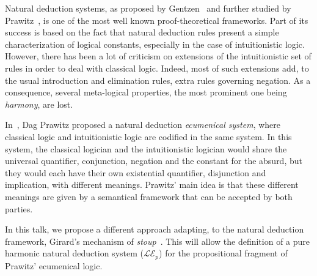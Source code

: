 \documentclass[bsl,meeting]{asl}
\newcommand{\NP}{}
\begin{document}
\thispagestyle{empty}


\NP  
{}

Natural deduction systems, as proposed by Gentzen~\cite{gentzen1969} and further studied by Prawitz~\cite{prawitz1965}, is one of the most well known proof-theoretical frameworks. Part of its success is based on the fact that natural deduction rules present a simple characterization of logical constants, especially in the case of intuitionistic logic. However, there has been a lot of criticism on extensions of the intuitionistic set of rules in order to deal with classical logic. Indeed, most of such extensions add, to the usual introduction and elimination rules, extra rules governing  negation. As a consequence, several meta-logical properties, the most prominent one being {\em harmony}, are lost.

In~\cite{DBLP:journals/Prawitz15}, Dag Prawitz proposed a
natural deduction {\em ecumenical system}, where classical logic and intuitionistic logic are codified in the same system. In this system, 
the classical logician and the intuitionistic logician would share the universal quantifier, conjunction, negation and the constant for the absurd, but they would each have their own existential quantifier, disjunction and implication, with different meanings. Prawitz' main idea is that these different meanings are given by a semantical framework that can be accepted by both parties.  

In this talk, we propose a different approach adapting, to the natural deduction framework,  Girard's mechanism of \textit{stoup}~\cite{DBLP:journals/mscs/Girard91}.  This will allow the definition of a pure harmonic natural deduction system ($\mathcal{LE}_{p}$) for the propositional fragment of  Prawitz' ecumenical logic.
\end{document}
